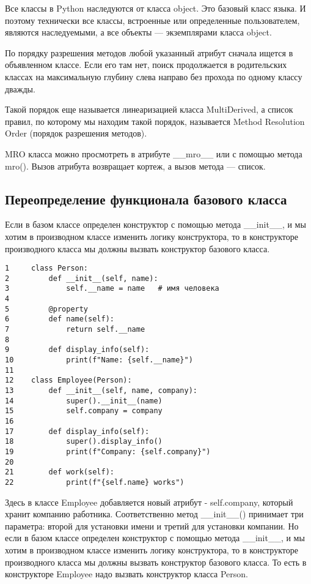 \documentclass[12pt, a4paper]{article}
\begin{document}
Все классы в Python наследуются от класса object. Это базовый класс языка.
И поэтому технически все классы, встроенные или определенные пользователем, являются наследуемыми, а все объекты — экземплярами класса object.

\vspace{1em}

По порядку разрешения методов любой указанный атрибут сначала ищется в объявленном классе. Если его там нет, поиск продолжается в родительских классах на максимальную глубину слева направо без прохода по одному классу дважды.

Такой порядок еще называется линеаризацией класса MultiDerived, а список правил, по которому мы находим такой порядок, называется Method Resolution Order (порядок разрешения методов).


MRO класса можно просмотреть в атрибуте \_\_mro\_\_ или с помощью метода mro(). Вызов атрибута возвращает кортеж, а вызов метода — список.

\subsection{Переопределение функционала базового класса}

Если в базом классе определен конструктор с помощью метода \_\_init\_\_, и мы хотим в производном классе изменить логику конструктора, то в конструкторе производного класса мы должны вызвать конструктор базового класса.

\begin{verbatim}
1     class Person: 
2         def __init__(self, name):
3             self.__name = name   # имя человека
4  
5         @property
6         def name(self):
7             return self.__name
8 
9         def display_info(self):
10            print(f"Name: {self.__name}") 
11 
12    class Employee(Person):
13        def __init__(self, name, company):
14            super().__init__(name)
15            self.company = company
16    
17        def display_info(self):
18            super().display_info()
19            print(f"Company: {self.company}")
20    
21        def work(self):
22            print(f"{self.name} works")
\end{verbatim}

Здесь в классе Employee добавляется новый атрибут - self.company, который хранит компанию работника. Соответственно метод \_\_init\_\_() принимает три параметра: второй для установки имени и третий для установки компании. Но если в базом классе определен конструктор с помощью метода \_\_init\_\_, и мы хотим в производном классе изменить логику конструктора, то в конструкторе производного класса мы должны вызвать конструктор базового класса. То есть в конструкторе Employee надо вызвать конструктор класса Person.
\end{document}
